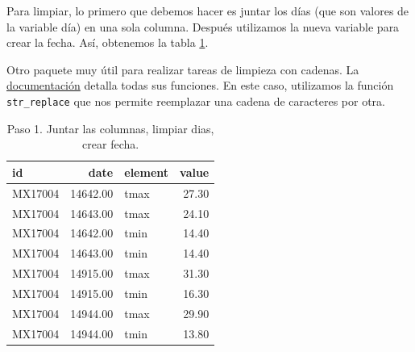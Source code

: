 \documentclass[]{article}
\newenvironment{Shaded}{\begin{snugshade}}{\end{snugshade}}
\newcommand{\KeywordTok}[1]{\textcolor[rgb]{0.13,0.29,0.53}{\textbf{{#1}}}}
\newcommand{\DataTypeTok}[1]{\textcolor[rgb]{0.13,0.29,0.53}{{#1}}}
\newcommand{\StringTok}[1]{\textcolor[rgb]{0.31,0.60,0.02}{{#1}}}
\newcommand{\CommentTok}[1]{\textcolor[rgb]{0.56,0.35,0.01}{\textit{{#1}}}}
\newcommand{\NormalTok}[1]{{#1}}
\begin{document}
Para limpiar, lo primero que debemos hacer es juntar los días (que son
valores de la variable día) en una sola columna. Después utilizamos la
nueva variable para crear la fecha. Así, obtenemos la tabla
\ref{tab:clima1}.

\begin{Shaded}
\end{Shaded}

\begin{nota}[stringr]
Otro paquete muy útil para realizar tareas de limpieza con cadenas. 
La \href{https://cran.r-project.org/web/packages/stringr/stringr.pdf}{documentación}
detalla todas sus funciones. En este caso, utilizamos la función \texttt{str\_replace}
que nos permite reemplazar una cadena de caracteres por otra.
\end{nota}

\begin{table}[ht]
\centering
\begin{tabular}{lrlr}
  \hline
id & date & element & value \\ 
  \hline
MX17004 & 14642.00 & tmax & 27.30 \\ 
  MX17004 & 14643.00 & tmax & 24.10 \\ 
  MX17004 & 14642.00 & tmin & 14.40 \\ 
  MX17004 & 14643.00 & tmin & 14.40 \\ 
  MX17004 & 14915.00 & tmax & 31.30 \\ 
  MX17004 & 14915.00 & tmin & 16.30 \\ 
  MX17004 & 14944.00 & tmax & 29.90 \\ 
  MX17004 & 14944.00 & tmin & 13.80 \\ 
   \hline
\end{tabular}
\caption{Paso 1. Juntar las columnas, limpiar dias, crear fecha.} 
\label{tab:clima1}
\end{table}
\end{document}
